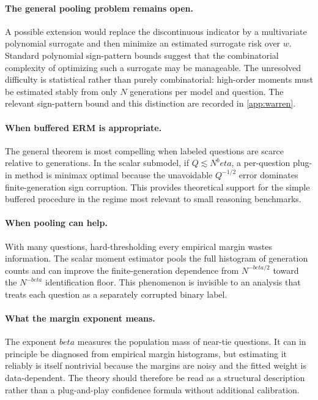 \documentclass[11pt]{article}
\def\beta{beta}%
\begin{document}
\paragraph{The general pooling problem remains open.}
A possible extension would replace the discontinuous indicator by a multivariate polynomial surrogate and then minimize an estimated surrogate risk over $w$.  Standard polynomial sign-pattern bounds suggest that the combinatorial complexity of optimizing such a surrogate may be manageable.  The unresolved difficulty is statistical rather than purely combinatorial: high-order moments must be estimated stably from only $N$ generations per model and question.  The relevant sign-pattern bound and this distinction are recorded in \cref{app:warren}.

\paragraph{When buffered ERM is appropriate.}
The general theorem is most compelling when labeled questions are scarce relative to generations.  In the scalar submodel, if $Q\lesssim N^\beta$, a per-question plug-in method is minimax optimal because the unavoidable $Q^{-1/2}$ error dominates finite-generation sign corruption.  This provides theoretical support for the simple buffered procedure in the regime most relevant to small reasoning benchmarks.

\paragraph{When pooling can help.}
With many questions, hard-thresholding every empirical margin wastes information.  The scalar moment estimator pools the full histogram of generation counts and can improve the finite-generation dependence from $N^{-\beta/2}$ toward the $N^{-\beta}$ identification floor.  This phenomenon is invisible to an analysis that treats each question as a separately corrupted binary label.

\paragraph{What the margin exponent means.}
The exponent $\beta$ measures the population mass of near-tie questions.  It can in principle be diagnosed from empirical margin histograms, but estimating it reliably is itself nontrivial because the margins are noisy and the fitted weight is data-dependent.  The theory should therefore be read as a structural description rather than a plug-and-play confidence formula without additional calibration.
\end{document}
